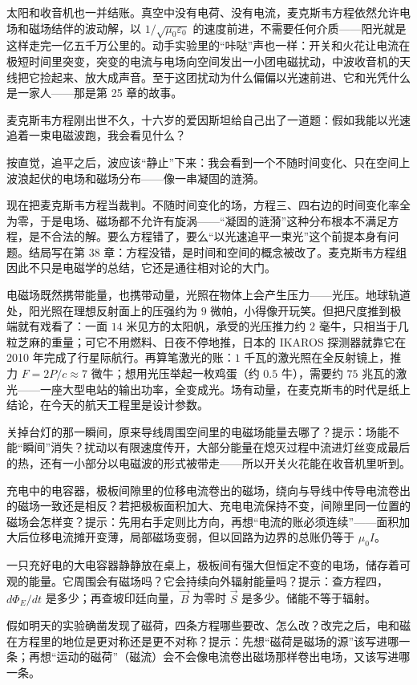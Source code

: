 太阳和收音机也一并结账。真空中没有电荷、没有电流，麦克斯韦方程依然允许电场和磁场结伴的波动解，以 \(1/\sqrt{\mu_0\varepsilon_0}\) 的速度前进，不需要任何介质——阳光就是这样走完一亿五千万公里的。动手实验里的“咔哒”声也一样：开关和火花让电流在极短时间里突变，突变的电流与电场向空间发出一小团电磁扰动，中波收音机的天线把它捡起来、放大成声音。至于这团扰动为什么偏偏以光速前进、它和光凭什么是一家人——那是第 25 章的故事。


\begin{thought}[追不上的光]
麦克斯韦方程刚出世不久，十六岁的爱因斯坦给自己出了一道题：假如我能以光速追着一束电磁波跑，我会看见什么？

按直觉，追平之后，波应该“静止”下来：我会看到一个不随时间变化、只在空间上波浪起伏的电场和磁场分布——像一串凝固的涟漪。

现在把麦克斯韦方程当裁判。不随时间变化的场，方程三、四右边的时间变化率全为零，于是电场、磁场都不允许有旋涡——“凝固的涟漪”这种分布根本不满足方程，是不合法的解。要么方程错了，要么“以光速追平一束光”这个前提本身有问题。结局写在第 38 章：方程没错，是时间和空间的概念被改了。麦克斯韦方程组因此不只是电磁学的总结，它还是通往相对论的大门。
\end{thought}

电磁场既然携带能量，也携带动量，光照在物体上会产生压力——光压。地球轨道处，阳光照在理想反射面上的压强约为 \(9\) 微帕，小得像开玩笑。但把尺度推到极端就有戏看了：一面 \(14\) 米见方的太阳帆，承受的光压推力约 \(2\) 毫牛，只相当于几粒芝麻的重量；可它不用燃料、日夜不停地推，日本的 IKAROS 探测器就靠它在 2010 年完成了行星际航行。再算笔激光的账：\(1\) 千瓦的激光照在全反射镜上，推力 \(F=2P/c\approx7\) 微牛；想用光压举起一枚鸡蛋（约 \(0.5\) 牛），需要约 \(75\) 兆瓦的激光——一座大型电站的输出功率，全变成光。场有动量，在麦克斯韦的时代是纸上结论，在今天的航天工程里是设计参数。

\begin{puzzles}
\item 关掉台灯的那一瞬间，原来导线周围空间里的电磁场能量去哪了？提示：场能不能“瞬间”消失？扰动以有限速度传开，大部分能量在熄灭过程中流进灯丝变成最后的热，还有一小部分以电磁波的形式被带走——所以开关火花能在收音机里听到。
\item 充电中的电容器，极板间隙里的位移电流卷出的磁场，绕向与导线中传导电流卷出的磁场一致还是相反？若把极板面积加大、充电电流保持不变，间隙里同一位置的磁场会怎样变？提示：先用右手定则比方向，再想“电流的账必须连续”——面积加大后位移电流摊开变薄，局部磁场变弱，但以回路为边界的总账仍等于 \(\mu_0 I\)。
\item 一只充好电的大电容器静静放在桌上，极板间有强大但恒定不变的电场，储存着可观的能量。它周围会有磁场吗？它会持续向外辐射能量吗？提示：查方程四，\(d\varPhi_E/dt\) 是多少；再查坡印廷向量，\(\vec B\) 为零时 \(\vec S\) 是多少。储能不等于辐射。
\item 假如明天的实验确凿发现了磁荷，四条方程哪些要改、怎么改？改完之后，电和磁在方程里的地位是更对称还是更不对称？提示：先想“磁荷是磁场的源”该写进哪一条；再想“运动的磁荷”（磁流）会不会像电流卷出磁场那样卷出电场，又该写进哪一条。
\end{puzzles}

